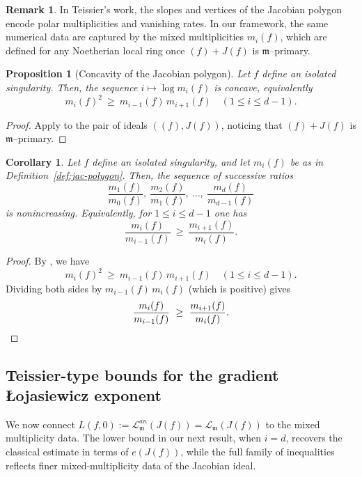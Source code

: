 \documentclass[12pt]{amsart}
\newcommand{\m}{\mathfrak m}
\newcommand{\Loj}{\mathcal{L}} %
\theoremstyle{plain}
\newtheorem{proposition}[theorem]{Proposition}
\newtheorem{corollary}[theorem]{Corollary}
\theoremstyle{definition}
\newtheorem{remark}[theorem]{Remark}
\numberwithin{equation}{section}
\begin{document}
\begin{remark}\label{rem:jac-polygon}
In Teissier's work, the slopes and vertices of the Jacobian polygon encode polar
multiplicities and vanishing rates. In our framework, the same numerical data are
captured by the mixed multiplicities $m_i(f)$, which are defined for any Noetherian
local ring once $(f)+J(f)$ is $\m$--primary.
\end{remark}

\begin{proposition}[Concavity of the Jacobian polygon]\label{prop:jac-concave}
Let $f$ define an isolated singularity. Then, the sequence $i\mapsto \log m_i(f)$ is concave,
equivalently
\[
m_i(f)^2\ \ge\ m_{i-1}(f)\,m_{i+1}(f)\quad (1\le i\le d-1).
\]
\end{proposition}

\begin{proof}
Apply  to the pair of ideals $((f),J(f))$, noticing that $(f)+J(f)$ is $\m$--primary.
\end{proof}

\begin{corollary}\label{cor:jac-slope-monotone}
Let $f$ define an isolated singularity, and let $m_i(f)$ be as in
Definition~\ref{def:jac-polygon}.  Then, the sequence of successive ratios
\[
\frac{m_1(f)}{m_0(f)},\ \frac{m_2(f)}{m_1(f)},\ \dots,\ \frac{m_d(f)}{m_{d-1}(f)}
\]
is nonincreasing. Equivalently, for $1\le i\le d-1$ one has
\[
\frac{m_i(f)}{m_{i-1}(f)}\ \ge\ \frac{m_{i+1}(f)}{m_i(f)}.
\]
\end{corollary}

\begin{proof}
By , we have
\[
m_i(f)^2\ \ge\ m_{i-1}(f)\,m_{i+1}(f)\quad (1\le i\le d-1).
\]
Dividing both sides by $m_{i-1}(f)\,m_i(f)$ (which is positive) gives
\[
\frac{m_i(f)}{m_{i-1}(f)}\ \ge\ \frac{m_{i+1}(f)}{m_i(f)}. \qedhere
\]
\end{proof}

\subsection{Teissier-type bounds for the gradient \L ojasiewicz exponent}

We now connect $L(f,0) := \Loj^{an}_\m(J(f)) = \Loj_{\m}(J(f))$ to the mixed multiplicity data.
The lower bound in our next result, when $i=d$, recovers the classical estimate in terms of $e(J(f))$, while the full family of inequalities reflects finer mixed-multiplicity data of the Jacobian ideal.
\end{document}
